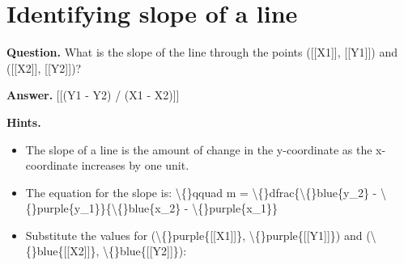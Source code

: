\documentclass{article}
\begin{document}
\section*{Identifying slope of a line}
\textbf{Question.} What is the slope of the line through the points ([[X1]], [[Y1]]) and ([[X2]], [[Y2]])?

\textbf{Answer.} [[(Y1 - Y2) / (X1 - X2)]]

\textbf{Hints.}
\begin{itemize}
  \item The slope of a line is the amount of change in the y-coordinate as the x-coordinate increases by one unit.
  \item The equation for the slope is:
                    \textbackslash\{\}qquad m = \textbackslash\{\}dfrac\{\textbackslash\{\}blue\{y\_2\} - \textbackslash\{\}purple\{y\_1\}\}\{\textbackslash\{\}blue\{x\_2\} - \textbackslash\{\}purple\{x\_1\}\}
  \item Substitute the values for
                            (\textbackslash\{\}purple\{[[X1]]\}, \textbackslash\{\}purple\{[[Y1]]\}) and
                            (\textbackslash\{\}blue\{[[X2]]\}, \textbackslash\{\}blue\{[[Y2]]\}):
                        

\end{itemize}
\end{document}
